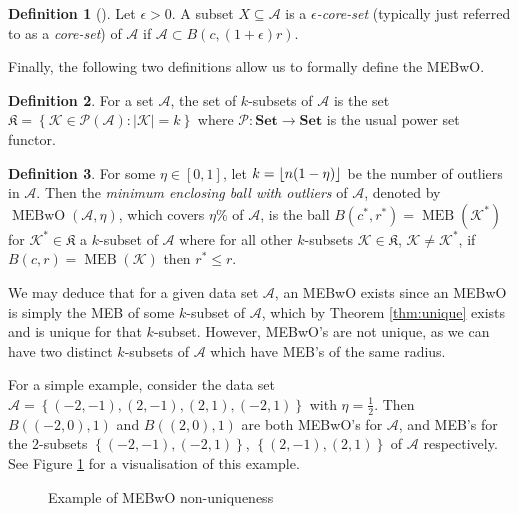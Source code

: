 \documentclass[11pt,twoside]{report}
\newcommand{\A}{\mathcal{A}} %
\newcommand{\K}{\mathcal{K}}
\DeclareMathOperator{\MEB}{MEB}
\DeclareMathOperator{\MEBwO}{MEBwO}
\DeclarePairedDelimiter\floor{\lfloor}{\rfloor}
\theoremstyle{definition}
\newtheorem{definition}{Definition}
\numberwithin{theorem}{section}
\numberwithin{definition}{section}
\numberwithin{lemma}{section}
\numberwithin{proposition}{section}
\numberwithin{equation}{section}
\numberwithin{figure}{section}
\begin{document}
\begin{definition}[{{\cite[page 2]{core-sets}}}]
    Let $\epsilon>0$. A subset $X\subseteq\A$ is a \textit{$\epsilon$-core-set} (typically just referred to as a \textit{core-set}) of $\A$ if $\A\subset B(c,(1+\epsilon)r)$.
\end{definition}
Finally, the following two definitions allow us to formally define the MEBwO.
\begin{definition}
    For a set $\A$, the set of $k$-subsets of $\A$ is the set $\mathfrak{K}=\left\{\K\in\mathscr{P}(\A): |\K|=k\right\}$ where $\mathcal{P}:\textbf{Set}\to\textbf{Set}$ is the usual power set functor.
\end{definition}

\begin{definition}
    For some $\eta\in[0,1]$, let $k=\floor{n(1-\eta)}$ be the number of outliers in $\A$. Then the \textit{minimum enclosing ball with outliers} of $\A$, denoted by $\MEBwO(\A,\eta)$, which covers $\eta\%$ of $\A$, is the ball $B(c^*,r^*)=\MEB(\K^*)$ for $\K^*\in\mathfrak{K}$ a $k$-subset of $\A$ where for all other $k$-subsets $\K\in\mathfrak{K}$, $\K\neq\K^*$, if $B(c,r)=\MEB(\K)$ then $r^*\leq r$.
\end{definition}

We may deduce that for a given data set $\A$, an MEBwO exists since an MEBwO is simply the MEB of some $k$-subset of $\A$, which by Theorem \ref{thm:unique} exists and is unique for that $k$-subset. However, MEBwO's are not unique, as we can have two distinct $k$-subsets of $\A$ which have MEB's of the same radius.

For a simple example, consider the data set $\A=\left\{(-2,-1),(2,-1),(2,1),(-2,1)\right\}$ with $\eta=\frac{1}{2}$. Then $B((-2,0),1)$ and $B((2,0),1)$ are both MEBwO's for $\A$, and MEB's for the $2$-subsets $\left\{(-2,-1), (-2,1)\right\}$, $\left\{(2,-1), (2,1)\right\}$ of $\A$ respectively. See Figure \ref{fig:mebwo non-unique} for a visualisation of this example.

\begin{figure}
    \centering
    \caption{Example of MEBwO non-uniqueness}
    \label{fig:mebwo non-unique}
\end{figure}
\end{document}

